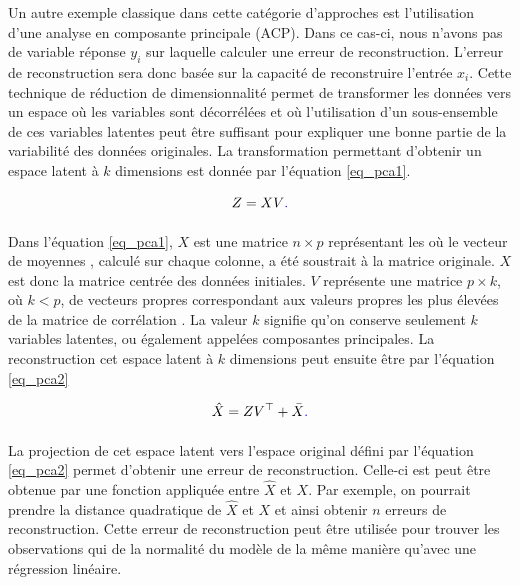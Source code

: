 Un autre exemple classique dans cette catégorie d'approches est l'utilisation d'une analyse en composante principale (ACP). Dans ce cas-ci, nous n'avons pas de variable réponse $y_i$ sur laquelle calculer une erreur de reconstruction. L'erreur de reconstruction sera donc basée sur la capacité de reconstruire l'entrée $x_i$. Cette technique de réduction de dimensionnalité permet de transformer les données vers un espace où les variables sont décorrélées et où l'utilisation d'un sous-ensemble de ces variables latentes peut être suffisant pour expliquer une bonne partie de la variabilité des données originales. La transformation permettant d'obtenir un espace latent à $k$ dimensions est donnée par l'équation \ref{eq_pca1}.

 \begin{gather}  \label{eq_pca1}
 Z = XV\DIFaddbegin \DIFadd{.
 }\DIFaddend \end{gather}

Dans l'équation \ref{eq_pca1}, $X$ est une matrice $n \times p$ représentant les \DIFdelbegin {}\DIFdelend \DIFaddbegin {}\DIFaddend où le vecteur de moyennes \DIFdelbegin \DIFdel{$\boldsymbol{\mu}$}\DIFdelend \DIFaddbegin {}\DIFaddend , calculé sur chaque colonne, a été soustrait à la matrice originale. $X$ est donc la matrice centrée des données initiales. $V$ représente une matrice $p \times k$, où $k < p$, de  vecteurs propres correspondant aux valeurs propres les plus élevées de la matrice de corrélation \DIFdelbegin \DIFdel{$\Sigma$}\DIFdelend \DIFaddbegin {}\DIFaddend . La valeur $k$ signifie qu'on conserve seulement $k$ variables latentes, ou également appelées composantes principales. La reconstruction \DIFdelbegin {}\DIFdelend \DIFaddbegin {}\DIFaddend cet espace latent à $k$ dimensions peut ensuite être \DIFdelbegin {}\DIFdelend \DIFaddbegin {}\DIFaddend par l'équation \ref{eq_pca2}\DIFdelbegin {}\DIFdelend \DIFaddbegin \DIFadd{:
 }\DIFaddend 

  \begin{gather}  \label{eq_pca2}
 \hat{X} = ZV^\top + \DIFdelbegin %
\DIFdelend \DIFaddbegin \bar{X}\DIFadd{.
 }\DIFaddend \end{gather}

La projection de cet espace latent vers l'espace original défini par l'équation \ref{eq_pca2} permet d'obtenir une erreur de reconstruction. Celle-ci est peut être obtenue par une fonction appliquée entre $\hat{X}$ et $X$. Par exemple, on pourrait prendre la distance quadratique \DIFdelbegin {}\DIFdelend \DIFaddbegin {}\DIFaddend de $\hat{X}$ et $X$ et ainsi obtenir $n$ erreurs de reconstruction. Cette erreur de reconstruction peut être utilisée pour trouver les observations qui \DIFdelbegin {}\DIFdelend \DIFaddbegin {}\DIFaddend de la normalité du modèle de la même manière qu'avec une régression linéaire.

